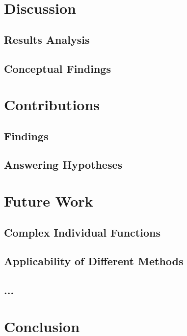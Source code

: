 \label{chap:discussion}

\section{Discussion}      


\subsection{Results Analysis}
\subsection{Conceptual Findings}

\section{Contributions} 

\subsection{Findings}
\subsection{Answering Hypotheses}


\section{Future Work}      

\subsection{Complex Individual Functions}
\subsection{Applicability of Different Methods}
\subsection{...}


\section{Conclusion}      



